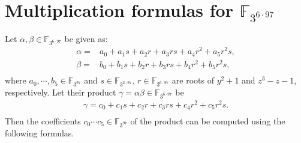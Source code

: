\documentclass{article}
\newcommand{\F}{\mathbb{F}}
\begin{document}
\appendix

\section{Multiplication formulas for $\F_{3^{6 \cdot 97}}$}
\label{sec:appendix}

Let $\alpha, \beta \in \F_{3^{6 \cdot 97}}$ be given as:
\begin{align*}
\alpha = & a_0+a_1s+a_2r+a_3rs+a_4r^2+a_5r^2s,\\
\beta = & b_0+b_1s+b_2r+b_3rs+b_4r^2+b_5r^2s,\\
\end{align*}
where $a_0, \cdots, b_5 \in \F_{3^{97}}$ and $s \in \F_{3^{2 \cdot
    97}}$, $r \in \F_{3^{6 \cdot 97}}$ are roots of $y^2+1$ and
$z^3-z-1$, respectively.
Let their product $\gamma = \alpha \beta \in \F_{3^{6 \cdot 97}}$ be 
\begin{align*}
\gamma = c_0+c_1s+c_2r+c_3rs+c_4r^2+c_5r^2s.\\
\end{align*}
Then the coefficients $c_0 \cdots c_5 \in \F_{3^{97}}$ of the product
can be computed using the following formulas.
\end{document}
